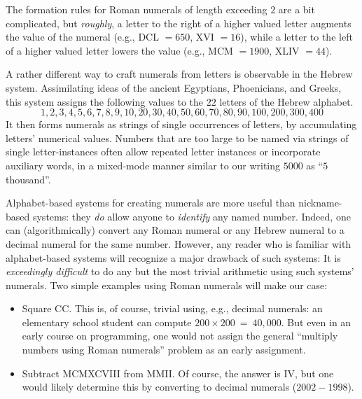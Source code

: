 \smallskip

\noindent
The formation rules for Roman numerals of length exceeding $2$ are a bit complicated, but {\em roughly}, a letter to the right of a higher valued letter augments the value of the numeral (e.g., DCL $=650$, XVI $=16$), while a letter to the left of a higher valued letter lowers the value (e.g., MCM $=1900$, XLIV $=44$).

\medskip

A rather different way to craft numerals from letters is observable in the Hebrew system.  Assimilating ideas of the ancient Egyptians, Phoenicians, and Greeks, this system assigns the
following values to the $22$ letters of the Hebrew alphabet.
\[ 1, 2, 3, 4, 5, 6, 7, 8, 9, 10,
20, 30, 40, 50, 60, 70, 80, 90, 100,
 200, 300, 400
\]
It then forms numerals as strings of single occurrences of letters, by accumulating letters' numerical values.  Numbers that are too large to be named via strings of single letter-instances often allow repeated letter instances or incorporate auxiliary words, in a mixed-mode manner similar to our writing $5000$ as ``$5$ thousand''.

\medskip

Alphabet-based systems for creating numerals are more useful than nickname-based systems: they {\em do} allow anyone to {\em identify} any named number. Indeed, one can (algorithmically) convert any Roman numeral or any Hebrew numeral to a decimal numeral for the same number.  However, any reader who is familiar with alphabet-based systems will recognize a major drawback of such systems: It is {\em exceedingly difficult} to do any but the most trivial arithmetic using such systems' numerals.  Two simple examples using Roman numerals will make our case:
\begin{itemize}
\item
Square CC.  This is, of course, trivial using, e.g., decimal numerals: an elementary school student can compute $200 \times 200 \ = \ 40,000$.  But even in an early course on programming, one would not assign the general ``multiply numbers using Roman numerals'' problem as an early assignment.

\medskip\item
Subtract MCMXCVIII from MMII.  Of course, the answer is IV, but one would likely determine this by converting to decimal numerals ($2002-1998$).
\end{itemize}

\medskip

